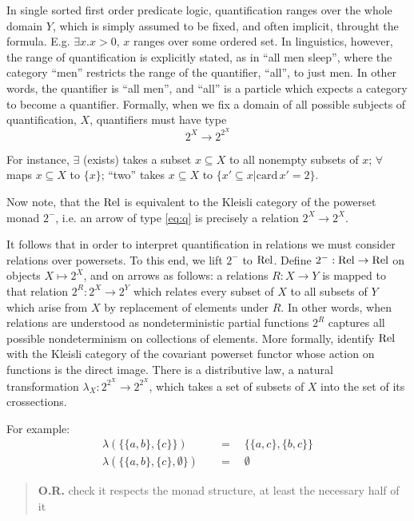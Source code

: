 In single sorted first order predicate logic, quantification ranges
over the whole domain $Y$, which is simply assumed to be fixed, and
often implicit, throught the formula. E.g. $\exists x. x > 0$, $x$
ranges over some ordered set. In linguistics, however, the range of
quantification is explicitly stated, as in ``all men sleep'', where
the category 
``men'' restricts the range of the quantifier, ``all'', to just
men. In other words, the quantifier is ``all men'', and ``all'' is a
particle which expects a category to become a quantifier. Formally,
when we fix a domain of all possible subjects of quantification, $X$,
quantifiers must have type 
\begin{equation}\label{eq:q}
2^X \to 2^{2^X}
\end{equation}

For instance, $\exists$ (exists) takes a subset $x\subseteq X$ to all
nonempty subsets of $x$; $\forall$ maps $x\subseteq X$ to $ \{ x \}$; ``two''
takes $x \subseteq X$ to $\{ x' \subseteq x | \mathrm{card}\,x' = 2 \}$.

Now note, that the $\mathrm{Rel}$ is equivalent to the Kleisli category of the
powerset monad $2^-$, i.e. an arrow of type \eqref{eq:q} is precisely
a relation $2^X \to 2^X$. 

\renewcommand{\wp}{2^}
It follows that in order to interpret quantification in relations we
must consider relations over powersets. 
To this end, we lift $\wp-$ to $\mathrm{Rel}$. Define $\wp- : \Rel \to
\Rel$ on objects $X \mapsto \wp X$, and on arrows as follows: a
relations $R : X \to Y$ is mapped to that relation $\wp R : \wp X \to
\wp Y$ which relates every subset of $X$ to all subsets of $Y$ which
arise from $X$ by replacement of elements under $R$. In other words,
when relations are understood as nondeterministic partial functions
$\wp R$ captures all possible nondeterminism on collections of
elements. More formally, identify $\mathrm{Rel}$ with the Kleisli
category of the covariant powerset functor whose action on functions
is the direct image. There is a distributive law, a natural
transformation $\lambda_X : \wp{\wp X} \to \wp{\wp X}$, which takes a
set of subsets of $X$ into the set of its crossections. 

For example: 
\begin{align*}
\lambda (\{\{a,b\},\{c\}\}) & \quad = \quad \{\{a,c\},\{b,c\}\}\\
\lambda (\{\{a,b\},\{c\},\emptyset\}) &\quad = \quad \emptyset
\end{align*}

\begin{quote}
{\bf O.R.} check it respects the monad structure, at least the necessary
  half of it 
\end{quote}

